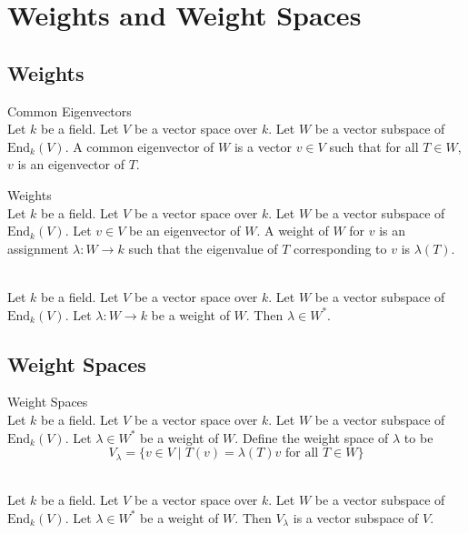 \documentclass[a4paper]{article}
\begin{document}
\pagebreak
\section{Weights and Weight Spaces}
\subsection{Weights}
\begin{defn}{Common Eigenvectors}{} \\Let $k$ be a field. Let $V$ be a vector space over $k$. Let $W$ be a vector subspace of $\text{End}_k(V)$. A common eigenvector of $W$ is a vector $v\in V$ such that for all $T\in W$, $v$ is an eigenvector of $T$. 
\end{defn}

\begin{defn}{Weights}{} \\Let $k$ be a field. Let $V$ be a vector space over $k$. Let $W$ be a vector subspace of $\text{End}_k(V)$. Let $v\in V$ be an eigenvector of $W$. A weight of $W$ for $v$ is an assignment $\lambda:W\to k$ such that the eigenvalue of $T$ corresponding to $v$ is $\lambda(T)$. 
\end{defn}

\begin{lmm}{}{} \\Let $k$ be a field. Let $V$ be a vector space over $k$. Let $W$ be a vector subspace of $\text{End}_k(V)$. Let $\lambda:W\to k$ be a weight of $W$. Then $\lambda\in W^\ast$. 
\end{lmm}

\subsection{Weight Spaces}
\begin{defn}{Weight Spaces}{} \\Let $k$ be a field. Let $V$ be a vector space over $k$. Let $W$ be a vector subspace of $\text{End}_k(V)$. Let $\lambda\in W^\ast$ be a weight of $W$. Define the weight space of $\lambda$ to be $$V_\lambda=\{v\in V\;|\;T(v)=\lambda(T)v\text{ for all }T\in W\}$$
\end{defn}

\begin{lmm}{}{} \\Let $k$ be a field. Let $V$ be a vector space over $k$. Let $W$ be a vector subspace of $\text{End}_k(V)$. Let $\lambda\in W^\ast$ be a weight of $W$. Then $V_\lambda$ is a vector subspace of $V$. 
\end{lmm}
\end{document}
